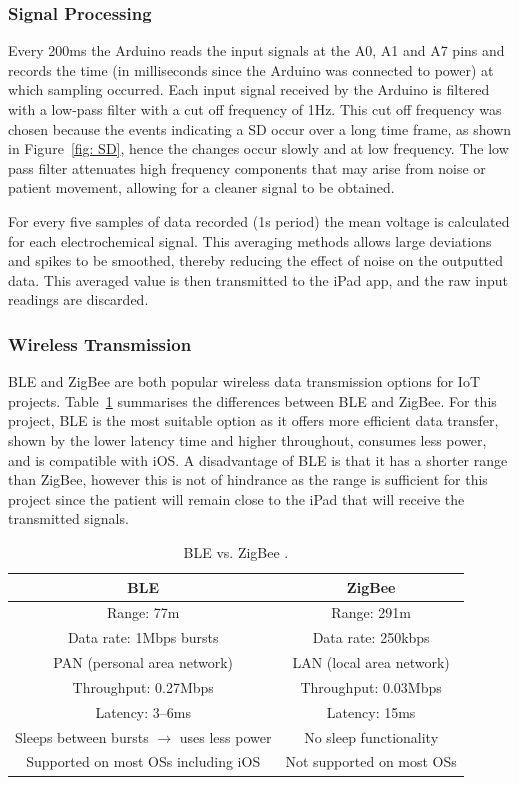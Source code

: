 \subsubsection{Signal Processing}
Every 200ms the Arduino reads the input signals at the A0, A1 and A7 pins and records the time (in milliseconds since the Arduino was connected to power) at which sampling occurred. Each input signal received by the Arduino is filtered with a low-pass filter with a cut off frequency of 1Hz. This cut off frequency was chosen because the events indicating a SD occur over a long time frame, as shown in Figure~\ref{fig: SD}, hence the changes occur slowly and at low frequency. The low pass filter attenuates high frequency components that may arise from noise or patient movement, allowing for a cleaner signal to be obtained.

For every five samples of data recorded (1s period) the mean voltage is calculated for each electrochemical signal. This averaging methods allows large deviations and spikes to be smoothed, thereby reducing the effect of noise on the outputted data. This averaged value is then transmitted to the iPad app, and the raw input readings are discarded.



\subsubsection{Wireless Transmission}
BLE and ZigBee are both popular wireless data transmission options for IoT projects. Table~\ref{table:BLE vs ZigBee} summarises the differences between BLE and ZigBee. For this project, BLE is the most suitable option as it offers more efficient data transfer, shown by the lower latency time and higher throughout, consumes less power, and is compatible with iOS. A disadvantage of BLE is that it has a shorter range than ZigBee, however this is not of hindrance as the range is sufficient for this project since the patient will remain close to the iPad that will receive the transmitted signals.

\begin{table}[h!]
\centering
\begin{tabular}{||c c||} 
 \hline
 BLE & ZigBee \\ [0.5ex] 
 \hline\hline
 Range: 77m & Range: 291m \\
 Data rate: 1Mbps bursts & Data rate: 250kbps \\ 
 PAN (personal area network) & LAN (local area network) \\
 Throughput: 0.27Mbps & Throughput: 0.03Mbps \\
 Latency: 3--6ms & Latency: 15ms \\
 Sleeps between bursts $\rightarrow$ uses less power & No sleep functionality \\
 Supported on most OSs including iOS & Not supported on most OSs \\
 \hline
\end{tabular}
\caption{BLE vs. ZigBee \cite{Ray2015, Christiano}.}
\label{table:BLE vs ZigBee}
\end{table}


